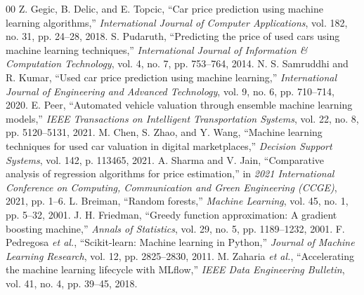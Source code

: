\documentclass[conference]{IEEEtran}
\begin{document}
\begin{thebibliography}{00}
 Z. Gegic, B. Delic, and E. Topcic, ``Car price prediction using machine learning algorithms,'' \textit{International Journal of Computer Applications}, vol. 182, no. 31, pp. 24--28, 2018.
 S. Pudaruth, ``Predicting the price of used cars using machine learning techniques,'' \textit{International Journal of Information \& Computation Technology}, vol. 4, no. 7, pp. 753--764, 2014.
 N. S. Samruddhi and R. Kumar, ``Used car price prediction using machine learning,'' \textit{International Journal of Engineering and Advanced Technology}, vol. 9, no. 6, pp. 710--714, 2020.
 E. Peer, ``Automated vehicle valuation through ensemble machine learning models,'' \textit{IEEE Transactions on Intelligent Transportation Systems}, vol. 22, no. 8, pp. 5120--5131, 2021.
 M. Chen, S. Zhao, and Y. Wang, ``Machine learning techniques for used car valuation in digital marketplaces,'' \textit{Decision Support Systems}, vol. 142, p. 113465, 2021.
 A. Sharma and V. Jain, ``Comparative analysis of regression algorithms for price estimation,'' in \textit{2021 International Conference on Computing, Communication and Green Engineering (CCGE)}, 2021, pp. 1--6.
 L. Breiman, ``Random forests,'' \textit{Machine Learning}, vol. 45, no. 1, pp. 5--32, 2001.
 J. H. Friedman, ``Greedy function approximation: A gradient boosting machine,'' \textit{Annals of Statistics}, vol. 29, no. 5, pp. 1189--1232, 2001.
 F. Pedregosa \textit{et al.}, ``Scikit-learn: Machine learning in Python,'' \textit{Journal of Machine Learning Research}, vol. 12, pp. 2825--2830, 2011.
 M. Zaharia \textit{et al.}, ``Accelerating the machine learning lifecycle with MLflow,'' \textit{IEEE Data Engineering Bulletin}, vol. 41, no. 4, pp. 39--45, 2018.
\end{thebibliography}
\end{document}
